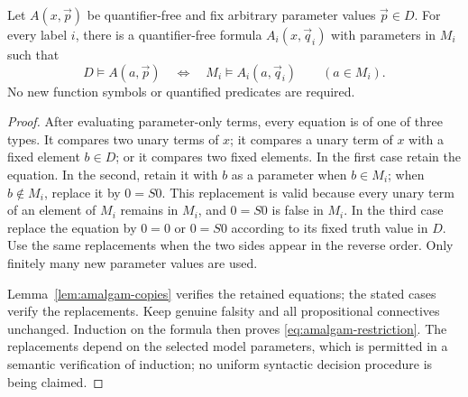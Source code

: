 \begin{lemma}
\label{lem:amalgam-restrict}
Let $A(x,\vec p)$ be quantifier-free and fix arbitrary parameter
values $\vec p\in D$. For every label $i$, there is a
quantifier-free formula $A_i(x,\vec q_i)$ with parameters in
$M_i$ such that
\[
 D\models A(a,\vec p)
 \quad\Longleftrightarrow\quad
 M_i\models A_i(a,\vec q_i)
 \qquad(a\in M_i).
 \tag{Res}\label{eq:amalgam-restriction}
\]
No new function symbols or quantified predicates are required.
\end{lemma}
\begin{proof}
After evaluating parameter-only terms, every equation is of one of
three types. It compares two unary terms of $x$; it compares a unary
term of $x$ with a fixed element $b\in D$; or it compares two
fixed elements. In the first case retain the equation. In the
second, retain it with $b$ as a parameter when $b\in M_i$;
when $b\notin M_i$, replace it by $0=S0$. This replacement is
valid because every unary term of an element of $M_i$ remains in
$M_i$, and $0=S0$ is false in $M_i$. In the third case replace
the equation by $0=0$ or $0=S0$ according to its fixed truth value
in $D$. Use the same replacements when the two sides appear in
the reverse order. Only finitely many new parameter values are used.

Lemma~\ref{lem:amalgam-copies} verifies the retained equations;
the stated cases verify the replacements. Keep genuine falsity and
all propositional connectives unchanged. Induction on the formula
then proves \eqref{eq:amalgam-restriction}. The replacements depend
on the selected model parameters, which is permitted in a semantic
verification of induction; no uniform syntactic decision procedure is
being claimed.
\end{proof}

